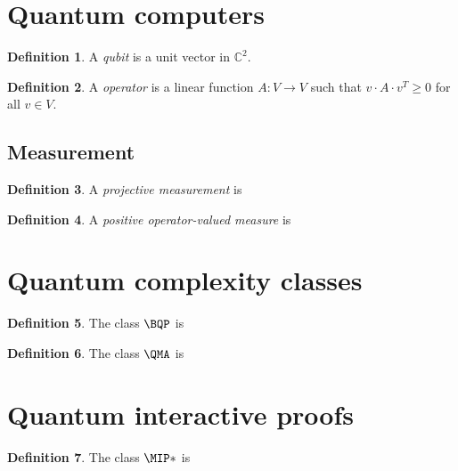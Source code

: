 \documentclass[english]{reedthesis}
\theoremstyle{plain}
\theoremstyle{definition}
\newtheorem{defn}[defn]{Definition}
\theoremstyle{remark}
\begin{document}
\section{Quantum computers}\label{sec:quant-comp}

\begin{defn}\label{def:qubit}
  A \emph{qubit} is a unit vector in $\mathbb{C}^{2}$.
\end{defn}

\begin{defn}\label{def:operator}
  A \emph{operator} is a linear function $A: V \rightarrow V$ such that
  $v \cdot A \cdot v^{T} \ge 0$ for all $v \in V$.
\end{defn}

\subsection{Measurement}

\begin{defn}\label{def:projective-measure}
  A \emph{projective measurement} is
\end{defn}

\begin{defn}\label{def:povm}
  A \emph{positive operator-valued measure} is
\end{defn}

\section{Quantum complexity classes}

\begin{defn}\label{def:bqp}
  The class $\BQP$ is
\end{defn}

\begin{defn}\label{def:qma}
  The class $\QMA$ is
\end{defn}

\section{Quantum interactive proofs}\label{sec:quant-interactive}

\begin{defn}\label{def:mip-star}
  The class $\MIP*$ is
\end{defn}
\end{document}
